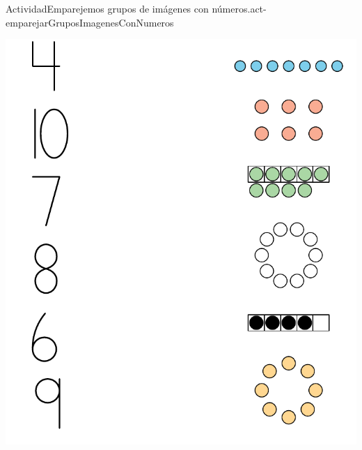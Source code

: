\documentclass[20pt]{extarticle}
\begin{document}
\begin{activity}{Actividad}{Emparejemos grupos de imágenes con números.}{act-emparejarGruposImagenesConNumeros}%
\begin{image}{0}{1}{0}{}%
\includegraphics[scale=1.2, max width=\linewidth, center]{external/svg-source/tikz-file-148539.pdf}
\end{image}%
\end{activity}
\end{document}
